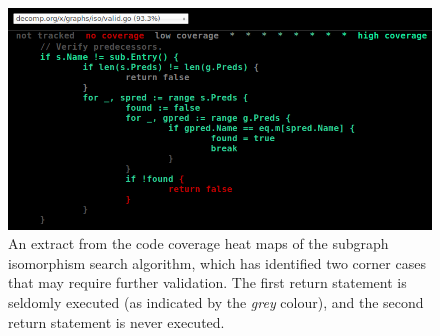 \begin{figure}[htbp]
	\begin{center}
		\includegraphics[width=\textwidth]{inc/8_ver/iso_heat_map.png}
		\caption{An extract from the code coverage heat maps of the subgraph isomorphism search algorithm, which has identified two corner cases that may require further validation. The first return statement is seldomly executed (as indicated by the \textit{grey} colour), and the second return statement is never executed.}
		\label{fig:iso_heat_map}
	\end{center}
\end{figure}
